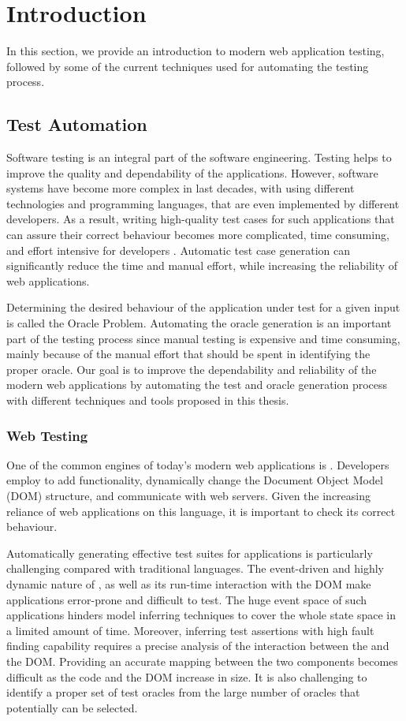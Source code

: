 \chapter{Introduction} \label{chap:intro}
In this section, we provide an introduction to modern web application testing, followed by some of the current techniques used for automating the testing process.

\section{Test Automation} \label{Sec:web-testing}
Software testing is an integral part of the software engineering.
Testing helps to improve the quality and dependability of the applications.
However, software systems have become more complex in last decades, with using different technologies and programming languages, that are even implemented by different developers.
As a result, writing high-quality test cases for such applications that can assure their correct behaviour becomes more complicated, time consuming, and effort intensive for developers \cite{anand:jss13}.
Automatic test case generation can significantly reduce the time and manual effort, while
increasing the reliability of web applications.

Determining the desired behaviour of the application under test for a given input is called the Oracle Problem.
Automating the oracle generation is an important part of the testing process since
manual testing is expensive and time consuming, mainly because of the manual effort that should be spent in identifying the proper oracle. Our goal is to improve the dependability and reliability of the modern web applications by automating the test and oracle generation process with different techniques and tools proposed in this thesis.

\subsection{Web Testing}
One of the common engines of today's modern web applications is \javascript.
Developers employ \javascript to add functionality, dynamically change the Document Object Model (DOM) structure,
and communicate with web servers. Given the increasing reliance of web applications on this language, it is important to check its correct behaviour.

Automatically generating effective test suites for \javascript applications is particularly challenging compared with traditional languages.
The event-driven and highly dynamic nature of \javascript, as well as its run-time interaction with the DOM make \javascript applications error-prone \cite{Ocariza:esem2013} and difficult to test. The huge event space of such applications hinders model inferring techniques to cover the whole state space in a limited amount of time. Moreover, inferring test assertions with high fault finding capability requires a precise analysis of the interaction between the \javascript and the DOM. 
Providing an accurate mapping between the two components becomes difficult as the \javascript code and the DOM increase in size. It is also challenging to identify a proper set of test oracles from the large number of oracles that potentially can be selected.

